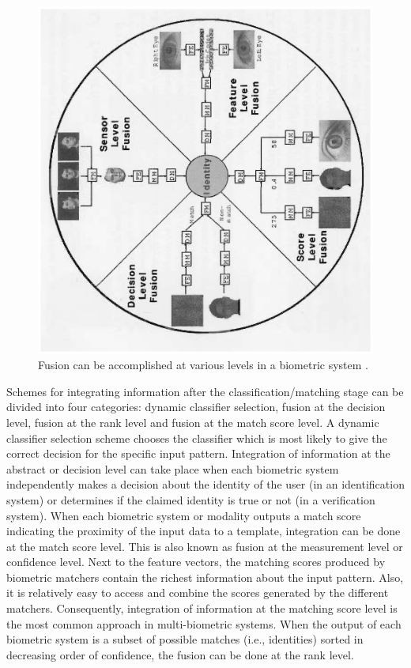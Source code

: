 \begin{figure}[tbp]
\begin{center}
  \includegraphics[angle = -90, scale = 0.8]{./chapters/Figures/fusion.eps}
  \caption{Fusion can be accomplished at various levels in a biometric system \cite{Ross06}.}\label{fig_fusion_techniques}
\end{center}
\end{figure}

Schemes for integrating information after the
classification/matching stage can be divided into four categories:
dynamic classifier selection, fusion at the decision level, fusion
at the rank level and fusion at the match score level. A dynamic
classifier selection scheme chooses the classifier which is most
likely to give the correct decision for the specific input pattern.
Integration of information at the abstract or decision level can
take place when each biometric system independently makes a decision
about the identity of the user (in an identification system) or
determines if the claimed identity is true or not (in a verification
system). When each biometric system or modality outputs a match
score indicating the proximity of the input data to a template,
integration can be done at the match score level. This is also known
as fusion at the measurement level or confidence level. Next to the
feature vectors, the matching scores produced by biometric matchers
contain the richest information about the input pattern. Also, it is
relatively easy to access and combine the scores generated by the
different matchers. Consequently, integration of information at the
matching score level is the most common approach in multi-biometric
systems. When the output of each biometric system is a subset of
possible matches (i.e., identities) sorted in decreasing order of
confidence, the fusion can be done at the rank level.

